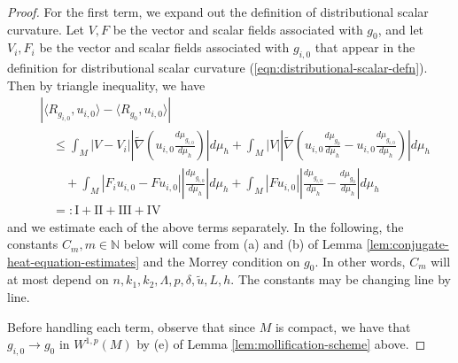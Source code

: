 \documentclass[12pt]{amsart}
\theoremstyle{plain}
\theoremstyle{plain}
\theoremstyle{definition}
\theoremstyle{remark}
\numberwithin{equation}{subsection}
\newcommand{\hdel}{\tilde{\nabla}}
\begin{document}
\begin{proof}
    For the first term, we expand out the definition of distributional scalar curvature. Let $V, F$ be the vector and scalar fields associated with $g_0$, and let $V_i, F_i$ be the vector and scalar fields associated with $g_{i,0}$ that appear in the definition for distributional scalar curvature (\ref{eqn:distributional-scalar-defn}). Then by triangle inequality, we have
    \begin{align*}
        &\left|\langle R_{g_{i,0}},u_{i,0}\rangle - \langle R_{g_0}, u_{i,0}\rangle\right| \nonumber \\
        &\quad \leq \int_M |V - V_i|\left|\hdel\left(u_{i,0}\frac{d\mu_{g_{i,0}}}{d\mu_h}\right)\right|d\mu_h + \int_M |V| \left|\hdel\left(u_{i,0}\frac{d\mu_{g_0}}{d\mu_h} - u_{i,0}\frac{d\mu_{g_{i,0}}}{d\mu_h}\right)\right|d\mu_h \nonumber \\
        &\qquad + \int_M |F_i u_{i,0} - F u_{i,0}|\left|\frac{d\mu_{g_{i,0}}}{d\mu_h}\right|d\mu_h + \int_M |Fu_{i,0}|\left|\frac{d\mu_{g_{i,0}}}{d\mu_h} - \frac{d\mu_{g_0}}{d\mu_h}\right|d\mu_h \nonumber \\
        &\quad =: \text{I} + \text{II} + \text{III} + \text{IV}
    \end{align*}
    and we estimate each of the above terms separately. In the following, the constants $C_m, m \in \mathbb{N}$ below will come from (a) and (b) of Lemma \ref{lem:conjugate-heat-equation-estimates} and the Morrey condition on $g_0$. In other words, $C_m$ will at most depend on $n, k_1, k_2, \Lambda, p, \delta, \tilde{u}, L, h$. The constants may be changing line by line.

    Before handling each term, observe that since $M$ is compact, we have that $g_{i,0} \to g_0$ in $W^{1,p}(M)$ by (e) of Lemma \ref{lem:mollification-scheme} above. 
    
%


\end{proof}
\end{document}
